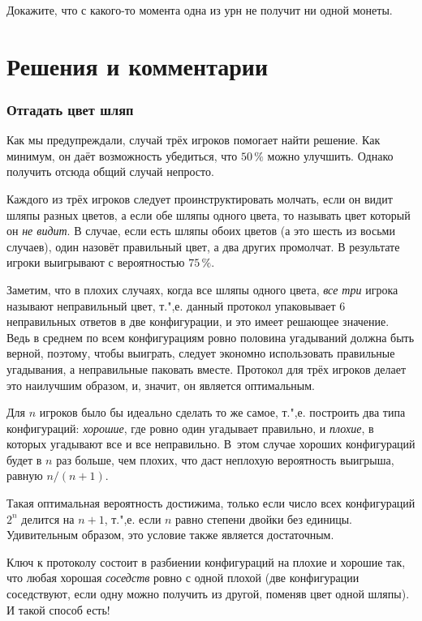 \documentclass[twoside]{book}
\begin{document}
Докажите, что с какого-то момента одна из урн не получит ни одной монеты.



\section*{Решения и комментарии}

\subsubsection*{Отгадать цвет шляп}

Как мы предупреждали, случай трёх игроков помогает найти решение.
Как минимум, он даёт возможность убедиться, что $50\,\%$ можно улучшить.
Однако получить отсюда общий случай непросто.

Каждого из трёх игроков следует проинструктировать молчать, если он видит шляпы разных цветов,
а если обе шляпы одного цвета, то называть цвет который он \emph{не видит}.
В случае, если есть шляпы обоих цветов (а это шесть из восьми случаев), один назовёт правильный цвет, а два других промолчат.
В результате игроки выигрывают с вероятностью $75\,\%$.

Заметим, что в плохих случаях, когда все шляпы одного цвета, \emph{все три} игрока называют неправильный цвет, т.",е. данный протокол упаковывает 6 неправильных ответов в две конфигурации, и это имеет решающее значение.
Ведь в среднем по всем конфигурациям ровно половина угадываний должна быть верной, поэтому, чтобы выиграть, следует экономно использовать правильные угадывания, а неправильные паковать вместе.
Протокол для трёх игроков делает это наилучшим образом, и, значит, он является оптимальным.

Для $n$ игроков было бы идеально сделать то же самое,
т.",е. построить два типа конфигураций: \emph{хорошие}, где ровно один угадывает правильно, и \emph{плохие}, в которых угадывают все\change{}{,} и все неправильно.
В~этом случае хороших конфигураций будет в $n$ раз больше, чем плохих,
что даст неплохую вероятность выигрыша, равную $n/(n+1)$.

Такая оптимальная вероятность достижима, только если число всех конфигураций $2^n$ делится на $n+1$,
т.",е. если $n$ равно степени двойки без единицы.
Удивительным образом, это условие также является достаточным.

Ключ к протоколу состоит в разбиении конфигураций на плохие и хорошие так, что любая хорошая \emph{соседств} ровно с одной плохой (две конфигурации соседствуют, если одну можно получить из другой, поменяв цвет одной шляпы).
И такой способ есть!
\end{document}
